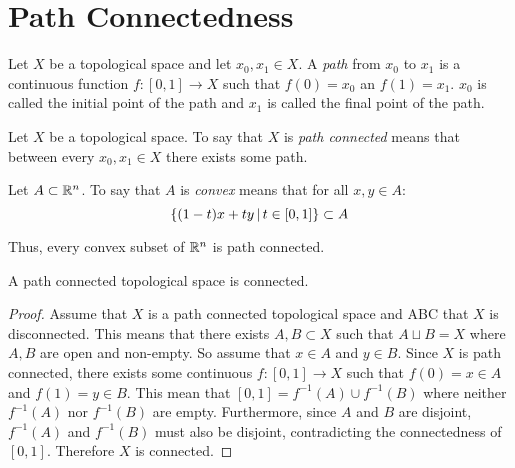 \documentclass[letterpaper,12pt,fleqn]{article}
\begin{document}
\section*{Path Connectedness}

\begin{definition}[Path]
  Let \(X\) be a topological space and let \(x_0,x_1\in X\).  A \emph{path} from \(x_0\) to \(x_1\) is a continuous
  function \(f:[0,1]\to X\) such that \(f(0)=x_0\) an \(f(1)=x_1\).  \(x_0\) is called the initial point of the path
  and \(x_1\) is called the final point of the path.
\end{definition}

\begin{definition}
  Let \(X\) be a topological space.  To say that \(X\) is \emph{path connected} means that between every
  \(x_0,x_1\in X\) there exists some path.
\end{definition}

\begin{definition}[Convex]
  Let \(A\subset\mathbb{R}^n\).  To say that \(A\) is \emph{convex} means that for all \(x,y\in A\):
  \[\left\{{(1-t)x+ty}\,\middle|\,{t\in[0,1]}\right\}\subset A\]
\end{definition}

Thus, every convex subset of \(\mathbb{R}^n\) is path connected.

\begin{theorem}
  A path connected topological space is connected.
\end{theorem}

\begin{proof}
  Assume that \(X\) is a path connected topological space and ABC that \(X\) is disconnected.  This means that
  there exists \(A,B\subset X\) such that \(A\sqcup B=X\) where \(A,B\) are open and non-empty.  So assume that
  \(x\in A\) and \(y\in B\).  Since \(X\) is path connected, there exists some continuous \(f:[0,1]\to X\) such
  that \(f(0)=x\in A\) and \(f(1)=y\in B\).  This mean that \([0,1]=f^{-1}(A)\cup f^{-1}(B)\) where neither
  \(f^{-1}(A)\) nor \(f^{-1}(B)\) are empty.  Furthermore, since \(A\) and \(B\) are disjoint, \(f^{-1}(A)\) and
  \(f^{-1}(B)\) must also be disjoint, contradicting the connectedness of \([0,1]\).  Therefore \(X\) is
  connected.
\end{proof}
\end{document}
